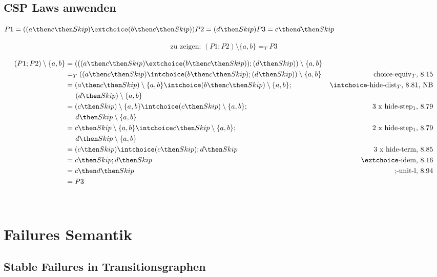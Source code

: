 \documentclass{scrreprt}
\begin{document}
\section{CSP Laws anwenden}

$
P1 = ((a \then c \then Skip) \extchoice (b \then c \then Skip))\\
P2 = (d \then Skip)\\
P3 = c \then d \then Skip
$

\begin{align*}
  \text{zu zeigen: } (P1; P2) \setminus \{a,b\} =_T P3
\end{align*}

\begin{align*}
  (P1; P2) \setminus \{a,b\} &= (((a \then c \then Skip) \extchoice (b \then c \then Skip)); (d \then Skip)) \setminus \{a,b\}& \\
         &=_T ((a \then c \then Skip) \intchoice (b \then c \then Skip); (d \then Skip)) \setminus \{a,b\} &\text{choice-equiv$_T$, 8.15}\\
         &= (a \then c \then Skip) \setminus \{a,b\} \intchoice (b \then c \then Skip) \setminus \{a,b\}; &\intchoice\text{-hide-dist$_T$, 8.81, NB}\\
         &\hspace{0.5cm}(d \then Skip) \setminus \{a,b\}\\
         &=(c \then Skip) \setminus \{a,b\} \intchoice (c \then Skip) \setminus \{a,b\}; &\text{3 x hide-step$_1$, 8.79}\\
         &\hspace{0.5cm} d \then Skip \setminus \{a,b\}\\
         &=c \then Skip \setminus \{a,b\} \intchoice c \then Skip \setminus \{a,b\}; &\text{2 x hide-step$_1$, 8.79}\\
         &\hspace{0.5cm} d \then Skip \setminus \{a,b\}\\
         &= (c \then Skip) \intchoice (c \then Skip); d \then Skip &\text{3 x hide-term, 8.85}\\
         &= c \then Skip; d \then Skip & \extchoice\text{-idem, 8.16}\\
         &= c \then d \then Skip & \text{;-unit-l, 8.94}\\
         &= P3
\end{align*}

\flushright{\qedsymbol}\\

\chapter{Failures Semantik}

\section{Stable Failures in Transitionsgraphen}
\end{document}
